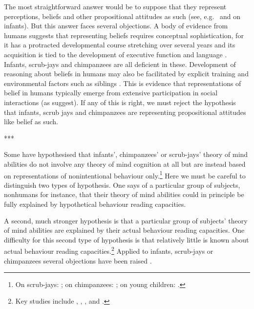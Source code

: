 \documentclass[12pt,\papersize]{extarticle}
\begin{document}
The most straightforward answer would be to suppose that they represent perceptions, beliefs and other propositional attitudes as such 
(see, e.g.\ \citealp{en_1138} and \citealp{en_1691} on infants).  
But this answer faces several objections.  A body of evidence from humans suggests that representing beliefs requires conceptual sophistication, for it has a protracted developmental course stretching over several years \citep[]{en_87, en_89} and its acquisition is tied to the development of executive function \citep[]{en_410, en_1130} and language \citep[]{en_1209}.  Infants, scrub-jays and chimpanzees are all deficient in these.  Development of reasoning about beliefs in humans may also be facilitated by explicit training \citep[]{en_85} and environmental factors such as siblings \citep[]{en_507, en_1299}.  
This is evidence that representations of belief in humans typically emerge from extensive participation in social interactions (as \citealp{en_1300} suggest).  
If any of this is right, we must reject the hypothesis that infants, scrub jays and chimpanzees are representing propositional attitudes like belief as such.






***

Some have hypothesised that infants', chimpanzees' or scrub-jays' theory of mind abilities 
do not involve any theory of mind cognition at all
but are instead based on 
representations of nonintentional behaviour only.\footnote{ 
	On scrub-jays: \citet{en_1417};
	 on chimpanzees: \citet{en_1413}; 
	 on young children: \citet{perner:1988_developing,en_1168, en_1169}.
}  
Here we must be careful to distinguish two types of  hypothesis.
One says of a particular group of subjects, nonhumans for instance, that their theory of mind abilities could in principle be fully explained by hypothetical behaviour reading capacities.


A second, much stronger hypothesis is that a particular group of subjects' theory of mind abilities are explained by their actual behaviour reading capacities.
One difficulty for this second type of hypothesis is that relatively little is known about actual behaviour reading capacities.\footnote{
Key studies include
	\citet{Newtson:1976ni}, 
	\citet{Byrne:1999jk},
	\citet{Baldwin:2001rs},
	\citet{Saylor:2007pj} and
	\citet{Baldwin:2008mw}.
}
Applied to infants, scrub-jays or chimpanzees several objections have been raised \citep[]{Apperly:2009ju,en_1553, Clayton:2007fh, en_1691, en_1393}. 
\end{document}
